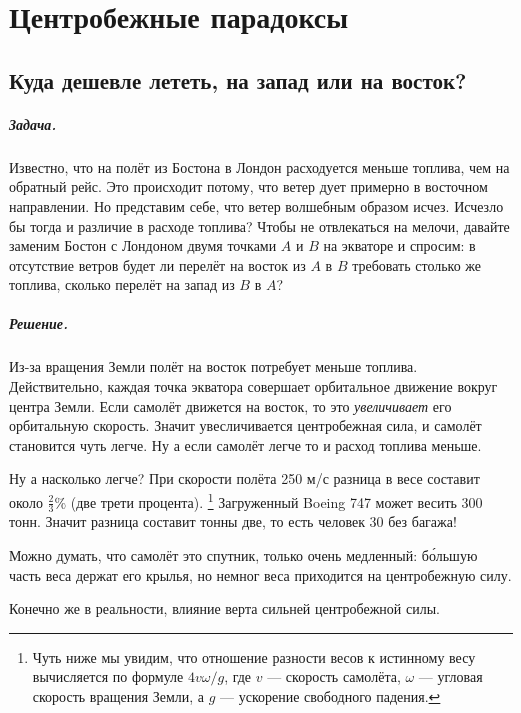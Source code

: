 \chapter{Центробежные парадоксы}

\section{Куда дешевле лететь, на запад или на восток?}

\paragraph{Задача.}
Известно, что на полёт из Бостона в Лондон расходуется меньше топлива, чем на обратный рейс.
Это происходит потому, что ветер дует примерно в восточном направлении.
Но представим себе, что ветер волшебным образом исчез.
Исчезло бы тогда и различие в расходе топлива?
Чтобы не отвлекаться на мелочи, давайте заменим Бостон с Лондоном двумя точками $A$ и $B$ на экваторе и спросим: в отсутствие ветров будет ли перелёт на восток из $A$ в $B$ требовать столько же топлива, сколько перелёт на запад из $B$ в $A$?

\paragraph{Решение.}
Из-за вращения Земли полёт на восток потребует меньше топлива.
Действительно, каждая точка экватора совершает орбитальное движение вокруг центра Земли.
Если самолёт движется на восток, то это \emph{увеличивает} его орбитальную скорость.
Значит увесличивается центробежная сила, и самолёт становится чуть легче.
Ну а если самолёт легче то и расход топлива меньше.

Ну а насколько легче?
При скорости полёта 250 м/с разница в весе составит около $
\tfrac23 \%$ (две трети процента).%
\footnote{Чуть ниже мы увидим, что отношение разности весов к истинному весу вычисляется по формуле
$4v\omega/g$,
где $v$ --- скорость самолёта,
$\omega$ --- угловая скорость вращения Земли,
а $g$ --- ускорение свободного падения.}
Загруженный Boeing 747 может весить 300 тонн.
Значит разница составит тонны две, то есть человек 30 без багажа!

Можно думать, что самолёт это спутник, только очень медленный:
б\'{о}льшую часть веса держат его крылья, но немног веса приходится на центробежную силу.

Конечно же в реальности, влияние верта сильней центробежной силы.

